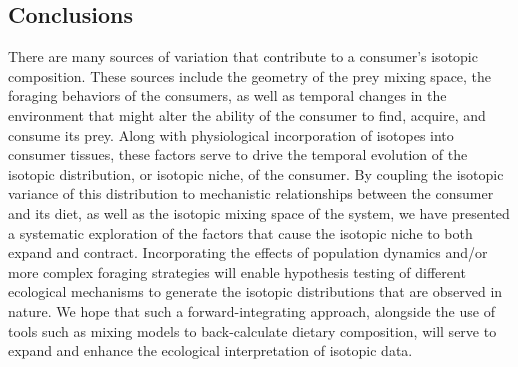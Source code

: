 \documentclass{article}
\begin{document}




%

\subsection*{Conclusions}

There are many sources of variation that contribute to a consumer's isotopic composition.
These sources include the geometry of the prey mixing space, the foraging behaviors of the consumers, as well as temporal changes in the environment that might alter the ability of the consumer to find, acquire, and consume its prey.
Along with physiological incorporation of isotopes into consumer tissues, these factors serve to drive the temporal evolution of the isotopic distribution, or isotopic niche, of the consumer.
By coupling the isotopic variance of this distribution to mechanistic relationships between the consumer and its diet, as well as the isotopic mixing space of the system, we have presented a systematic exploration of the factors that cause the isotopic niche to both expand and contract.
Incorporating the effects of population dynamics and/or more complex foraging strategies will enable hypothesis testing of different ecological mechanisms to generate the isotopic distributions that are observed in nature.
We hope that such a forward-integrating approach, alongside the use of tools such as mixing models to back-calculate dietary composition, will serve to expand and enhance the ecological interpretation of isotopic data.
\end{document}
